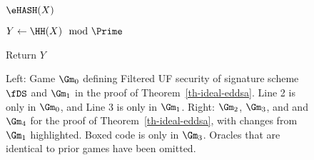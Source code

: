 \begin{figure}[t]
{			\begin{oracle}{$\eHASH(X)$}
			    \item $Y \gets \HH(X) \mod \Prime$
			    \item {}
				\item \quad {}
				\item {}
			    \item Return $Y$
		        \end{oracle}
		    \ExptSepSpace
	}
	\vspace{-5pt}
	\caption{
		Left: Game $\Gm_0$ defining Filtered UF security of signature scheme $\fDS$ and $\Gm_1$ in the proof of Theorem~\ref{th-ideal-eddsa}. Line 2 is only in $\Gm_0$, and Line 3 is only in $\Gm_1$. Right: $\Gm_2$, $\Gm_3$, and and $\Gm_4$ for the proof of Theorem~\ref{th-ideal-eddsa}, with changes from $\Gm_1$ highlighted. Boxed code is only in $\Gm_3$. Oracles that are identical to prior games have been omitted.}
		\label{fig:gm-pf-ts-eddsa-0-3}
		\hrulefill
		\vspace{-10pt}
	\end{figure}
	
